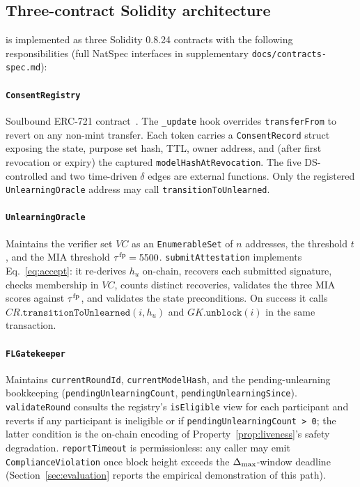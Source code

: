 \subsection{Three-contract Solidity architecture}
\label{sec:framework-contracts}

\sysname is implemented as three Solidity 0.8.24 contracts with the
following responsibilities (full NatSpec interfaces in supplementary
\texttt{docs/contracts-spec.md}):

\paragraph{\texttt{ConsentRegistry}} Soulbound ERC-721 contract~\cite{erc721}. The \texttt{\_update} hook overrides
\texttt{transferFrom} to revert on any non-mint transfer. Each token
carries a \texttt{ConsentRecord} struct exposing the \clsm state,
purpose set hash, TTL, owner address, and (after first revocation
or expiry) the captured \texttt{modelHashAtRevocation}. The five
DS-controlled and two time-driven $\delta$ edges are external
functions. Only the registered \texttt{UnlearningOracle} address may
call \texttt{transitionToUnlearned}.

\paragraph{\texttt{UnlearningOracle}} Maintains the verifier set
$\mathit{VC}$ as an \texttt{EnumerableSet} of $n$ addresses, the
threshold $t$, and the MIA threshold $\tau^{\mathrm{fp}} = 5500$.
\texttt{submitAttestation} implements Eq.~\ref{eq:accept}: it
re-derives $h_u$ on-chain, recovers each submitted signature, checks
membership in $\mathit{VC}$, counts distinct recoveries, validates the
three MIA scores against $\tau^{\mathrm{fp}}$, and validates the
state preconditions. On success it calls
$\mathit{CR}.\mathtt{transitionToUnlearned}(i, h_u)$ and
$\mathit{GK}.\mathtt{unblock}(i)$ in the same transaction.

\paragraph{\texttt{FLGatekeeper}} Maintains \texttt{currentRoundId},
\texttt{currentModelHash}, and the pending-unlearning bookkeeping
(\texttt{pendingUnlearningCount}, \texttt{pendingUnlearningSince}).
\texttt{validateRound} consults the registry's \texttt{isEligible}
view for each participant and reverts if any participant is
ineligible or if \texttt{pendingUnlearningCount > 0}; the latter
condition is the on-chain encoding of
Property~\ref{prop:liveness}'s safety degradation.
\texttt{reportTimeout} is permissionless: any caller may emit
\texttt{ComplianceViolation} once block height exceeds the
$\Delta_{\max}$-window deadline (Section~\ref{sec:evaluation} reports the empirical
demonstration of this path).

